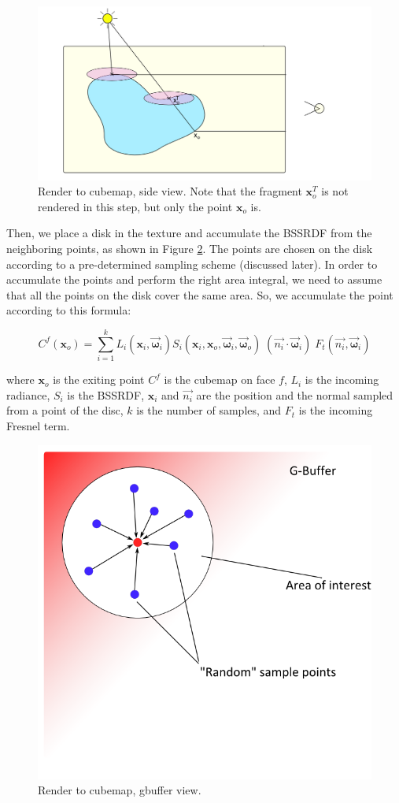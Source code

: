 \begin{figure}[!ht]
\centering
\includegraphics[width=\linewidth]{images/method/method_frustumside}
\caption{Render to cubemap, side view. Note that the fragment $\mathbf{x}^T_o$ is not rendered in this step, but only the point $\mathbf{x}_o$ is.}
\label{fig:stepfrustum}
\end{figure} 


Then, we place a disk in the texture and accumulate the BSSRDF from the neighboring points, as shown in Figure \ref{fig:stepgbuffer}. The points are chosen on the disk according to a pre-determined sampling scheme (discussed later). In order to accumulate the points and perform the right area integral, we need to assume that all the points on the disk cover the same area. So, we accumulate the point according to this formula:


\[
C^f(\mathbf{x}_o) = \sum_{i = 1}^{k} L_i(\mathbf{x}_i,\vec{\mathbf{\omega}}_i) S_i(\mathbf{x}_i,\mathbf{x}_o,\vec{\mathbf{\omega}}_i, \vec{\mathbf{\omega}}_o) \; (\vec{n_i}\cdot \vec{\mathbf{\omega}}_i) \; F_t(\vec{n_i},\vec{\mathbf{\omega}}_i) 
\]

where $\mathbf{x}_o$ is the exiting point $C^f$ is the cubemap on face $f$, $L_i$ is the incoming radiance, $S_i$ is the BSSRDF, $\mathbf{x}_i$ and $\vec{n_i}$ are the position and the normal sampled from a point of the disc, $k$ is the number of samples, and $F_t$ is the incoming Fresnel term.

\begin{figure}[!ht]
\centering
\includegraphics[width=0.5 \linewidth]{images/method/method_gbuffer}
\caption{Render to cubemap, gbuffer view.}
\label{fig:stepgbuffer}
\end{figure} 

